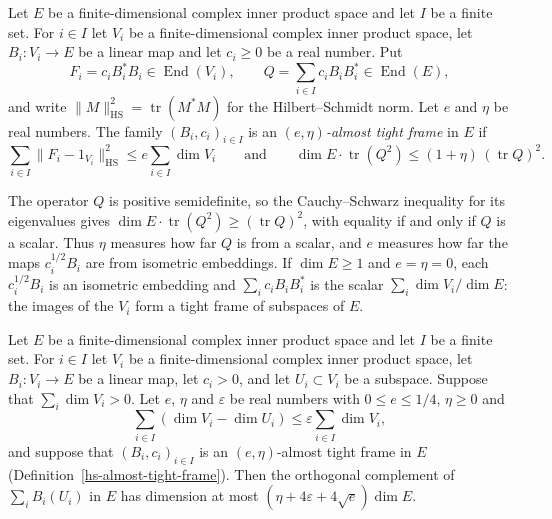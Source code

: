 \begin{definition}\label{hs-almost-tight-frame}
Let $E$ be a finite-dimensional complex inner product space and let $I$ be a finite set. For
$i\in I$ let $V_i$ be a finite-dimensional complex inner product space, let $B_i:V_i\to E$ be a
linear map and let $c_i\geq0$ be a real number. Put
\[
 F_i=c_iB_i^*B_i\in\operatorname{End}(V_i),\qquad Q=\sum_{i\in I}c_iB_iB_i^*\in\operatorname{End}(E),
\]
and write $\|M\|_{\mathrm{HS}}^2=\operatorname{tr}(M^*M)$ for the Hilbert--Schmidt norm. Let $e$
and $\eta$ be real numbers. The family $(B_i,c_i)_{i\in I}$ is an \emph{$(e,\eta)$-almost tight
frame} in $E$ if
\[
 \sum_{i\in I}\|F_i-1_{V_i}\|_{\mathrm{HS}}^2\leq e\sum_{i\in I}\dim V_i
 \qquad\text{and}\qquad
 \dim E\cdot\operatorname{tr}(Q^2)\leq(1+\eta)\,(\operatorname{tr}Q)^2 .
\]
\end{definition}

\begin{remark}\label{hs-tight-frame-meaning}
The operator $Q$ is positive semidefinite, so the Cauchy--Schwarz inequality for its eigenvalues
gives $\dim E\cdot\operatorname{tr}(Q^2)\geq(\operatorname{tr}Q)^2$, with equality if and only
if $Q$ is a scalar. Thus $\eta$ measures how far $Q$ is from a scalar, and $e$ measures how far
the maps $c_i^{1/2}B_i$ are from isometric embeddings. If $\dim E\geq1$ and $e=\eta=0$, each
$c_i^{1/2}B_i$ is an isometric embedding and $\sum_ic_iB_iB_i^*$ is the scalar
$\sum_i\dim V_i/\dim E$: the images of the $V_i$ form a tight frame of subspaces of $E$.
\end{remark}

\begin{lemma}\label{hs-frame-complement}
Let $E$ be a finite-dimensional complex inner product space and let $I$ be a finite set. For
$i\in I$ let $V_i$ be a finite-dimensional complex inner product space, let $B_i:V_i\to E$ be a
linear map, let $c_i>0$, and let $U_i\subset V_i$ be a subspace. Suppose that
$\sum_i\dim V_i>0$. Let $e$, $\eta$ and $\varepsilon$ be real numbers with $0\leq e\leq1/4$,
$\eta\geq0$ and
\[
 \sum_{i\in I}(\dim V_i-\dim U_i)\leq\varepsilon\sum_{i\in I}\dim V_i,
\]
and suppose that $(B_i,c_i)_{i\in I}$ is an $(e,\eta)$-almost tight frame in $E$
(Definition~\ref{hs-almost-tight-frame}). Then the orthogonal complement of
$\sum_iB_i(U_i)$ in $E$ has dimension at most $(\eta+4\varepsilon+4\sqrt e)\dim E$.
\end{lemma}


